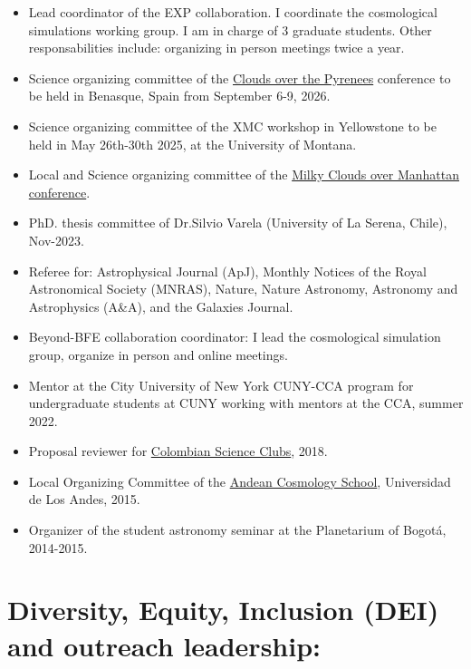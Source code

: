 \documentclass[14pt]{article}
\begin{document}
\begin{itemize}
  \setlength\itemsep{0.0em}
  \renewcommand\labelitemi{$\cdot$}

\item Lead coordinator of the EXP collaboration. I coordinate the cosmological
  simulations working group. I am in charge of 3 graduate students. Other responsabilities include: organizing in person meetings twice a year.
\item Science organizing committee of the  \href{https://benasque.org/new_general/cgi-bin/years.pl?ano=2026}{Clouds over
  the Pyrenees} conference to be held in Benasque, Spain from September 6-9, 2026. 
  \item Science organizing committee of the XMC workshop in Yellowstone to be held
  in May 26th-30th 2025, at the University of Montana. 
\item Local and Science organizing committee of the \href{https://events.simonsfoundation.org/event/1f18ba51-d6da-414f-b492-9590f29ad048/summary}{Milky Clouds over Manhattan conference}. 
\item PhD. thesis committee of Dr.Silvio Varela (University of La Serena, Chile), Nov-2023. 
\item Referee for: Astrophysical Journal (ApJ), Monthly Notices of the Royal  Astronomical Society (MNRAS), Nature, Nature Astronomy, Astronomy and
  Astrophysics (A\&A), and the Galaxies Journal.
\item Beyond-BFE collaboration coordinator: I lead the cosmological simulation group, organize in person and online meetings.
\item Mentor at the City University of New York CUNY-CCA program for undergraduate students at CUNY working with mentors at the CCA, summer 2022. 
\item Proposal reviewer for \href{https://clubesdeciencia.co/}{Colombian Science Clubs}, 2018.
\item Local Organizing Committee of the \href{http://forero.github.io/AndeanCosmologySchool/}{Andean Cosmology School}, Universidad de Los Andes, 2015.
\item Organizer of the student astronomy seminar at the Planetarium of Bogot\'a, 2014-2015.
\end{itemize}


\section*{Diversity, Equity, Inclusion (DEI) and outreach leadership:}
\end{document}

